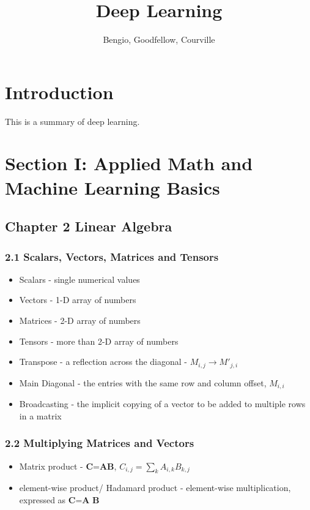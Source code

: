 \documentclass[a4paper]{report}
\title{Deep Learning}
\author{Bengio, Goodfellow, Courville}
\begin{document}
\maketitle

\tableofcontents

\chapter{Introduction}
This is a summary of deep learning.

\chapter{Section I: Applied Math and Machine Learning Basics}
\section{Chapter 2 Linear Algebra}
\subsection{2.1 Scalars, Vectors, Matrices and Tensors}
\begin{itemize}
    \item Scalars - single numerical values
    \item Vectors - 1-D array of numbers
    \item Matrices - 2-D array of numbers
    \item Tensors - more than 2-D array of numbers
    \item Transpose - a reflection across the diagonal - $M_{i,j}\rightarrow M'_{j,i}$
    \item Main Diagonal - the entries with the same row and column offset, $M_{i,i}$
    \item Broadcasting - the implicit copying of a vector to be added to multiple rows in a matrix
\end{itemize}

\subsection{2.2 Multiplying Matrices and Vectors}
\begin{itemize}
    \item Matrix product - $\textbf{C=AB}$, $C_{i,j}=\sum_k A_{i,k}B_{k,j}$
    \item element-wise product/ Hadamard product - element-wise multiplication, expressed as $\textbf{C=A B}$
\end{itemize}
\end{document}
